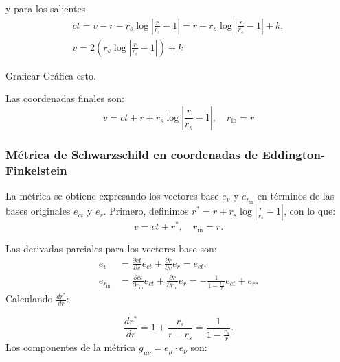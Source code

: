 y para los salientes
\begin{equation}
    \begin{aligned}
        ct = v - r - r_s \log \left| \frac{r}{r_s} - 1 \right|= r + r_s \log \left| \frac{r}{r_s} - 1 \right| + k, \\
        v = 2 \left(r_s \log \left| \frac{r}{r_s} - 1 \right|\right) +k
    \end{aligned}
\end{equation}
\begin{task}{Graficar}{}
    Gráfica esto.
\end{task}
Las coordenadas finales son:
\begin{equation}
    \boxed{
        v = ct + r + r_s \log \left| \frac{r}{r_s} - 1 \right|, \quad
        r_{\text{in}} = r
    }
\end{equation}

\subsubsection{Métrica de Schwarzschild en coordenadas de Eddington-Finkelstein}
La métrica se obtiene expresando los vectores base \( e_v \) y \( e_{r_{\text{in}}} \) en términos de las bases originales \( e_{ct} \) y \( e_r \). Primero, definimos \( r^* = r + r_s \log \left| \frac{r}{r_s} - 1 \right| \), con lo que:
\begin{equation}
    v = ct + r^*, \quad r_{\text{in}} = r.
\end{equation}

Las derivadas parciales para los vectores base son:
\begin{equation}
    \begin{aligned}
        e_v               & = \frac{\partial ct}{\partial v} e_{ct} + \frac{\partial r}{\partial v} e_r = e_{ct},                                                            \\
        e_{r_{\text{in}}} & = \frac{\partial ct}{\partial r_{\text{in}}} e_{ct} + \frac{\partial r}{\partial r_{\text{in}}} e_r = -\frac{1}{1 - \frac{r_s}{r}} e_{ct} + e_r.
    \end{aligned}
\end{equation}
Calculando \( \frac{dr^*}{dr} \):

\begin{equation}
    \frac{dr^*}{dr} = 1 + \frac{r_s}{r - r_s} = \frac{1}{1 - \frac{r_s}{r}}.
\end{equation}
Los componentes de la métrica \( g_{\mu\nu} = e_\mu \cdot e_\nu \) son:

